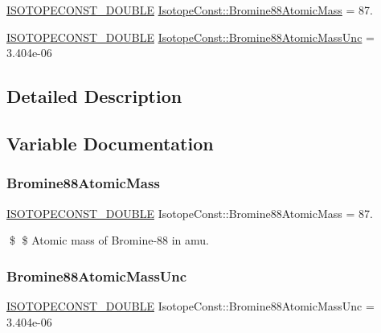 \begin{DoxyCompactItemize}
\item 
\mbox{\hyperlink{group___isotope_const-_macros_ga8f45a7272ce02c0b4c65c44636ed719a}{I\+S\+O\+T\+O\+P\+E\+C\+O\+N\+S\+T\+\_\+\+D\+O\+U\+B\+LE}} \mbox{\hyperlink{group___isotope_const-_bromine-_br88_gacdd15b02858cc7a2022a64b92e32ec23}{Isotope\+Const\+::\+Bromine88\+Atomic\+Mass}} = 87.
\item 
\mbox{\hyperlink{group___isotope_const-_macros_ga8f45a7272ce02c0b4c65c44636ed719a}{I\+S\+O\+T\+O\+P\+E\+C\+O\+N\+S\+T\+\_\+\+D\+O\+U\+B\+LE}} \mbox{\hyperlink{group___isotope_const-_bromine-_br88_gaeaa26464b963bb000a4e65957e6de57a}{Isotope\+Const\+::\+Bromine88\+Atomic\+Mass\+Unc}} = 3.\+404e-\/06
\end{DoxyCompactItemize}


\subsection{Detailed Description}


\subsection{Variable Documentation}
\mbox{\label{group___isotope_const-_bromine-_br88_gacdd15b02858cc7a2022a64b92e32ec23}} 
\subsubsection{\texorpdfstring{Bromine88\+Atomic\+Mass}{Bromine88AtomicMass}}
{\footnotesize\ttfamily \mbox{\hyperlink{group___isotope_const-_macros_ga8f45a7272ce02c0b4c65c44636ed719a}{I\+S\+O\+T\+O\+P\+E\+C\+O\+N\+S\+T\+\_\+\+D\+O\+U\+B\+LE}} Isotope\+Const\+::\+Bromine88\+Atomic\+Mass = 87.}

\$ \$ Atomic mass of Bromine-\/88 in amu. \mbox{\label{group___isotope_const-_bromine-_br88_gaeaa26464b963bb000a4e65957e6de57a}} 
\subsubsection{\texorpdfstring{Bromine88\+Atomic\+Mass\+Unc}{Bromine88AtomicMassUnc}}
{\footnotesize\ttfamily \mbox{\hyperlink{group___isotope_const-_macros_ga8f45a7272ce02c0b4c65c44636ed719a}{I\+S\+O\+T\+O\+P\+E\+C\+O\+N\+S\+T\+\_\+\+D\+O\+U\+B\+LE}} Isotope\+Const\+::\+Bromine88\+Atomic\+Mass\+Unc = 3.\+404e-\/06}


